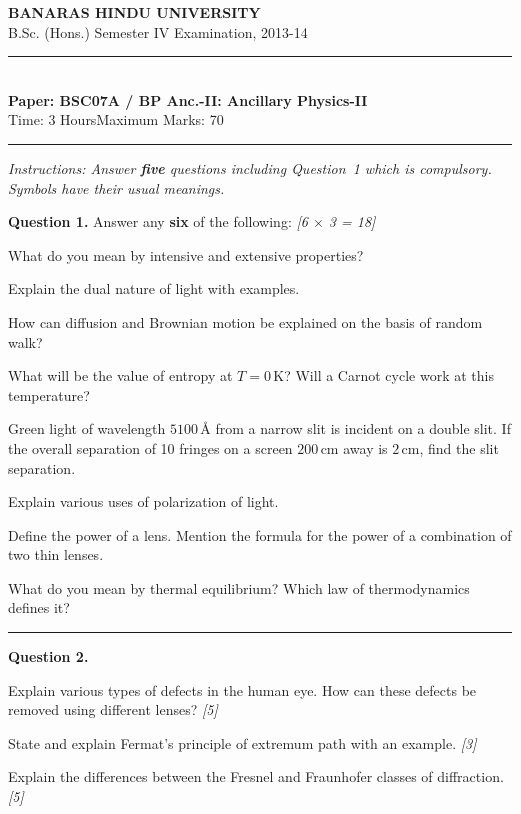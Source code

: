 \documentclass[11pt,a4paper]{article}
\newcommand{\pts}[1]{\hfill   \textit{[#1]}}
\begin{document}
\begin{center}
  {\large\bfseries BANARAS HINDU UNIVERSITY}\\[2pt]
  {\normalsize B.Sc. (Hons.) Semester IV Examination, 2013-14}\\[6pt]
  \rule{0.8\linewidth}{0.5pt}\\[6pt]
  {\large\bfseries Paper: BSC07A / BP Anc.-II: Ancillary Physics-II}\\[4pt]
  {\normalsize Time: 3 Hours\hfill Maximum Marks: 70}
\end{center}
\rule{\linewidth}{0.4pt}
\smallskip



\noindent   \textit{Instructions: Answer   \textbf{five} questions including Question~1 which is compulsory. Symbols have their usual meanings.}
\bigskip




\noindent   \textbf{Question 1.} Answer any   \textbf{six} of the following: \pts{6 $ \times$ 3 = 18}

\begin{parts}
  \item What do you mean by intensive and extensive properties?
  \item Explain the dual nature of light with examples.
  \item How can diffusion and Brownian motion be explained on the basis of random walk?
  \item What will be the value of entropy at $T = 0\, \text{K}$? Will a Carnot cycle work at this temperature?
  \item Green light of wavelength $5100\, \text{\AA}$ from a narrow slit is incident on a double slit. If the overall separation of 10 fringes on a screen $200\, \text{cm}$ away is $2\, \text{cm}$, find the slit separation.
  \item Explain various uses of polarization of light.
  \item Define the power of a lens. Mention the formula for the power of a combination of two thin lenses.
  \item What do you mean by thermal equilibrium? Which law of thermodynamics defines it?
\end{parts}

\medskip\rule{\linewidth}{0.2pt}




\noindent   \textbf{Question 2.}

\begin{parts}
  \item Explain various types of defects in the human eye. How can these defects be removed using different lenses? \pts{5}
  \item State and explain Fermat's principle of extremum path with an example. \pts{3}
  \item Explain the differences between the Fresnel and Fraunhofer classes of diffraction. \pts{5}
\end{parts}
\end{document}
